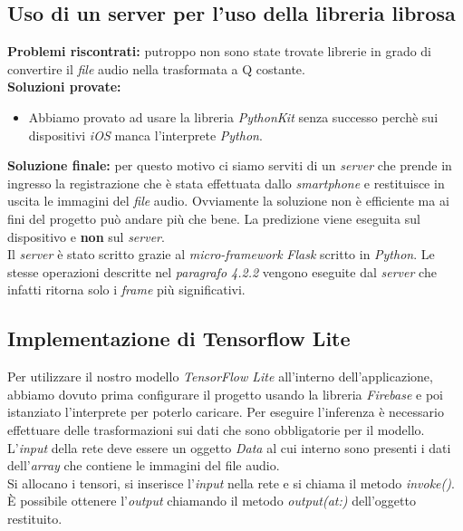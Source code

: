 \subsection{Uso di un server per l'uso della libreria librosa}
\textbf{Problemi riscontrati:} putroppo non sono state trovate librerie in grado di convertire il \textit{file} audio nella trasformata a Q costante.\\
\newline
%
\textbf{Soluzioni provate:}
\begin{itemize}
	\item Abbiamo provato ad usare la libreria \textit{PythonKit} senza successo perchè sui dispositivi \textit{iOS} manca l'interprete \textit{Python}.\\
\end{itemize}
%
\textbf{Soluzione finale:} per questo motivo ci siamo serviti di un \textit{server} che prende in ingresso la registrazione che è stata effettuata dallo \textit{smartphone} e restituisce in uscita le immagini del \textit{file} audio. Ovviamente la soluzione non è efficiente ma ai fini del progetto può andare più che bene. La predizione viene eseguita sul dispositivo e \textbf{non} sul \textit{server}.\\
\newline
Il \textit{server} è stato scritto grazie al \textit{micro-framework} \textit{Flask} scritto in \textit{Python}.
\vspace*{2ex}
\vspace*{2ex}
Le stesse operazioni descritte nel \textit{paragrafo 4.2.2} vengono eseguite dal \textit{server} che infatti ritorna solo i \textit{frame} più significativi.
\subsection{Implementazione di Tensorflow Lite}
Per utilizzare il nostro modello \textit{TensorFlow Lite} all'interno dell'applicazione, abbiamo dovuto prima configurare il progetto usando la libreria \textit{Firebase} e poi istanziato l'interprete per poterlo caricare.
\vspace*{2ex}
\vspace*{2ex}
\noindent Per eseguire l'inferenza è necessario effettuare delle trasformazioni sui dati che sono obbligatorie per il modello. L'\textit{input} della rete deve essere un oggetto \textit{Data} al cui interno sono presenti i dati dell'\textit{array} che contiene le immagini del file audio.\\
Si allocano i tensori, si inserisce l'\textit{input} nella rete e si chiama il metodo \textit{invoke()}.
È possibile ottenere l'\textit{output} chiamando il metodo \textit{output(at:)} dell'oggetto restituito.
\vspace*{2ex}
